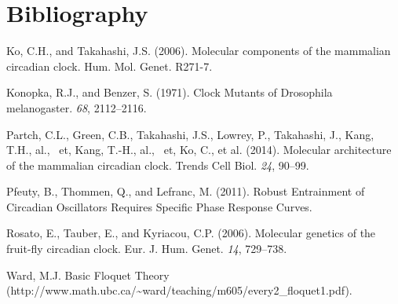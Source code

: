\documentclass[10pt,letter, swedish, english,%
]{article}
\begin{document}
\section*{Bibliography}
Ko, C.H., and Takahashi, J.S. (2006). Molecular components of the
mammalian circadian clock. Hum. Mol. Genet. R271-7.

\bigskip\noindent
Konopka, R.J., and Benzer, S. (1971). Clock Mutants of Drosophila
melanogaster. \textit{68}, 2112–2116.

\bigskip\noindent
Partch, C.L., Green, C.B., Takahashi, J.S., Lowrey, P., Takahashi, J.,
Kang, T.H., al., \ et, Kang, T.-H., al., \ et, Ko, C., et al. (2014).
Molecular architecture of the mammalian circadian clock. Trends Cell
Biol. \textit{24}, 90–99.

\bigskip\noindent
Pfeuty, B., Thommen, Q., and Lefranc, M. (2011). Robust Entrainment of
Circadian Oscillators Requires Specific Phase Response Curves.

\bigskip\noindent
Rosato, E., Tauber, E., and Kyriacou, C.P. (2006). Molecular genetics
of the fruit-fly circadian clock. Eur. J. Hum. Genet. \textit{14},
729–738.

\bigskip\noindent
Ward, M.J. Basic Floquet Theory
(http://www.math.ubc.ca/\~{}ward/teaching/m605/every2\_floquet1.pdf).
\end{document}
